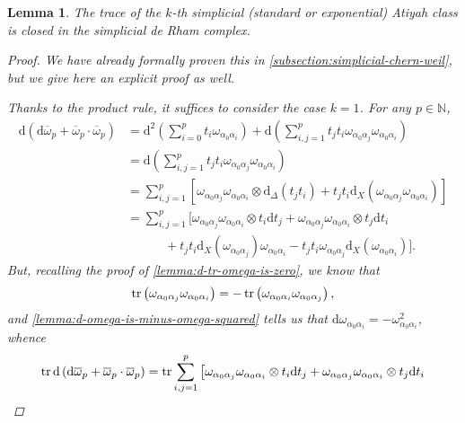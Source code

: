 \documentclass[11pt,fleqn]{article}
\theoremstyle{plain}
\newtheorem{lemma}[theorem]{Lemma}
\theoremstyle{definition}
\theoremstyle{remark}
\numberwithin{equation}{theorem}
\renewcommand{\d}{\mathrm{d}}
\begin{document}
        \begin{lemma}
            The trace of the $k$-th simplicial (standard or exponential) Atiyah class is closed in the simplicial de Rham complex.
            \begin{proof}
                We have already formally proven this in \cref{subsection:simplicial-chern-weil}, but we give here an explicit proof as well.

                Thanks to the product rule, it suffices to consider the case $k=1$.
                For any $p\in\mathbb{N}$,
                \begin{align*}
                    \d\left(\d\overline{\omega}_p+\overline{\omega}_p\cdot\overline{\omega}_p\right) &= \d^2\left(\sum_{i=0}^p t_i\omega_{\alpha_0\alpha_i}\right)+\d\left(\sum_{i,j=1}^p t_jt_i\omega_{\alpha_0\alpha_j}\omega_{\alpha_0\alpha_i}\right)\\
                    &=\d\left(\sum_{i,j=1}^p t_jt_i\omega_{\alpha_0\alpha_j}\omega_{\alpha_0\alpha_i}\right)\\
                    &=\sum_{i,j=1}^p\left[\omega_{\alpha_0\alpha_j}\omega_{\alpha_0\alpha_i}\otimes\d_{\Delta}(t_jt_i) + t_jt_i\d_X\left(\omega_{\alpha_0\alpha_j}\omega_{\alpha_0\alpha_i}\right)\right]\\
                    &=\sum_{i,j=1}^p\big[\omega_{\alpha_0\alpha_j}\omega_{\alpha_0\alpha_i}\otimes t_i\d t_j + \omega_{\alpha_0\alpha_j}\omega_{\alpha_0\alpha_i}\otimes t_j\d t_i\\
                    &\qquad\quad + t_jt_i\d_X\left(\omega_{\alpha_0\alpha_j}\right)\omega_{\alpha_0\alpha_i} - t_jt_i\omega_{\alpha_0\alpha_j}\d_X\left(\omega_{\alpha_0\alpha_i}\right)\big].
                \end{align*}
                But, recalling the proof of \cref{lemma:d-tr-omega-is-zero}, we know that
                \[
                    \tr\left(\omega_{\alpha_0\alpha_j}\omega_{\alpha_0\alpha_i}\right)=-\tr\left(\omega_{\alpha_0\alpha_i}\omega_{\alpha_0\alpha_j}\right),
                \]
                and \cref{lemma:d-omega-is-minus-omega-squared} tells us that $\d\omega_{\alpha_0\alpha_i}=-\omega_{\alpha_0\alpha_i}^2$, whence
                \begin{align*}
                    \tr\d\left(\d\overline{\omega}_p+\overline{\omega}_p\cdot\overline{\omega}_p\right) &= \tr\sum_{i,j=1}^p\big[\omega_{\alpha_0\alpha_j}\omega_{\alpha_0\alpha_i}\otimes t_i\d t_j + \omega_{\alpha_0\alpha_j}\omega_{\alpha_0\alpha_i}\otimes t_j\d t_i\\

\end{align*}
\end{proof}
\end{lemma}
\end{document}
